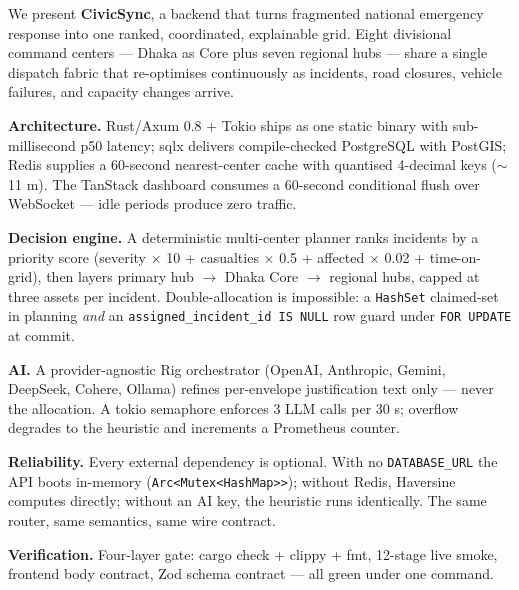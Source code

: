 \documentclass[10pt,letterpaper]{article}
\begin{document}
\begin{tcolorbox}[colback=csbg, colframe=csblue, boxrule=0.6pt, arc=3pt,
    left=8pt, right=8pt, top=6pt, bottom=6pt, title=\textbf{Abstract (250 words)},
    fonttitle=\bfseries]
\small
We present \textbf{CivicSync}, a backend that turns fragmented national emergency response into one ranked, coordinated, explainable grid. Eight divisional command centers --- Dhaka as Core plus seven regional hubs --- share a single dispatch fabric that re-optimises continuously as incidents, road closures, vehicle failures, and capacity changes arrive.

\textbf{Architecture.} Rust/Axum 0.8 + Tokio ships as one static binary with sub-millisecond p50 latency; sqlx delivers compile-checked PostgreSQL with PostGIS; Redis supplies a 60-second nearest-center cache with quantised 4-decimal keys ($\sim$11 m). The TanStack dashboard consumes a 60-second conditional flush over WebSocket --- idle periods produce zero traffic.

\textbf{Decision engine.} A deterministic multi-center planner ranks incidents by a priority score (severity $\times$ 10 + casualties $\times$ 0.5 + affected $\times$ 0.02 + time-on-grid), then layers primary hub $\rightarrow$ Dhaka Core $\rightarrow$ regional hubs, capped at three assets per incident. Double-allocation is impossible: a \texttt{HashSet} claimed-set in planning \emph{and} an \texttt{assigned\_incident\_id IS NULL} row guard under \texttt{FOR UPDATE} at commit.

\textbf{AI.} A provider-agnostic Rig orchestrator (OpenAI, Anthropic, Gemini, DeepSeek, Cohere, Ollama) refines per-envelope justification text only --- never the allocation. A tokio semaphore enforces 3 LLM calls per 30 s; overflow degrades to the heuristic and increments a Prometheus counter.

\textbf{Reliability.} Every external dependency is optional. With no \texttt{DATABASE\_URL} the API boots in-memory (\texttt{Arc<Mutex<HashMap>>}); without Redis, Haversine computes directly; without an AI key, the heuristic runs identically. The same router, same semantics, same wire contract.

\textbf{Verification.} Four-layer gate: cargo check + clippy + fmt, 12-stage live smoke, frontend body contract, Zod schema contract --- all green under one command.
\end{tcolorbox}

\clearpage
\end{document}
